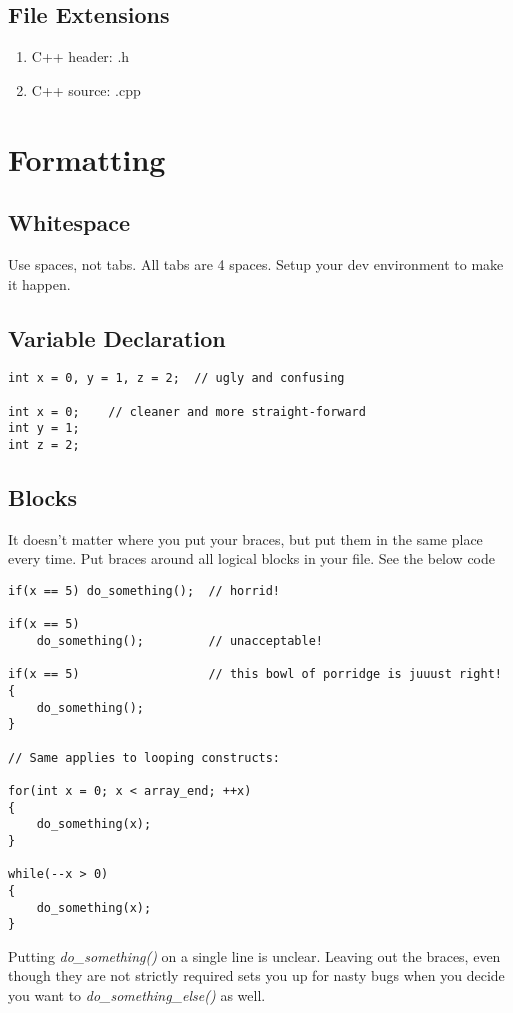 \documentclass{article}
\begin{document}
\subsection{File Extensions}
\begin{enumerate}
 \item C++ header: .h
 \item C++ source: .cpp
\end{enumerate}

\section{Formatting}
\subsection{Whitespace}
Use spaces, not tabs. All tabs are 4 spaces. Setup your dev environment to make it happen.

\subsection{Variable Declaration}
\begin{verbatim}
int x = 0, y = 1, z = 2;  // ugly and confusing

int x = 0;    // cleaner and more straight-forward
int y = 1;
int z = 2;
\end{verbatim}

\subsection{Blocks}
It doesn't matter where you put your braces, but put them in the same place every time. Put braces around all logical blocks in your file. See the below code
\begin{verbatim}
if(x == 5) do_something();  // horrid!

if(x == 5)
    do_something();         // unacceptable!

if(x == 5)                  // this bowl of porridge is juuust right!
{
    do_something();
}

// Same applies to looping constructs:

for(int x = 0; x < array_end; ++x)
{
    do_something(x);
}

while(--x > 0)
{
    do_something(x);
}

\end{verbatim}

Putting \textit{do\_something()} on a single line is unclear. Leaving out the braces, even though they are not strictly required sets you up for nasty bugs when you decide you want to \textit{do\_something\_else()} as well.
\end{document}

